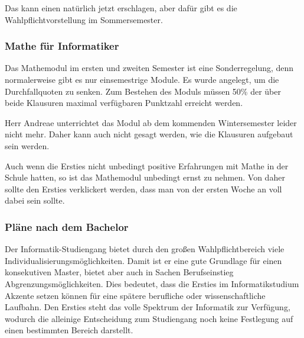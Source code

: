 \documentclass[a4paper,11pt]{scrartcl} %
\begin{document}
Das kann einen natürlich jetzt erschlagen, aber dafür gibt es die Wahlpflichtvorstellung im Sommersemester.

		\subsubsection*{Mathe für Informatiker}
		
Das Mathemodul im ersten und zweiten Semester ist eine Sonderregelung, denn normalerweise gibt es nur einsemestrige Module. Es wurde angelegt, um die Durchfallquoten zu senken. Zum Bestehen des Moduls müssen 50\% der über beide Klausuren maximal verfügbaren Punktzahl erreicht werden.

Herr Andreae unterrichtet das Modul ab dem kommenden Wintersemester leider nicht mehr. Daher kann auch nicht gesagt werden, wie die Klausuren aufgebaut sein werden.

Auch wenn die Ersties nicht unbedingt positive Erfahrungen mit Mathe in der Schule hatten, so ist das Mathemodul unbedingt ernst zu nehmen. Von daher sollte den Ersties verklickert werden, dass man von der ersten Woche an voll dabei sein sollte.

		\subsubsection*{Pläne nach dem Bachelor}

Der Informatik-Studiengang bietet durch den großen Wahlpflichtbereich viele Individualisierungsmöglichkeiten. Damit ist er eine gute Grundlage für einen konsekutiven Master, bietet aber auch in Sachen Berufseinstieg Abgrenzungsmöglichkeiten. Dies bedeutet, dass die Ersties im Informatikstudium Akzente setzen können für eine spätere berufliche oder wissenschaftliche Laufbahn. Den Ersties steht das volle Spektrum der Informatik zur Verfügung, wodurch die alleinige Entscheidung zum Studiengang noch keine Festlegung auf einen bestimmten Bereich darstellt.
  
\end{document}

